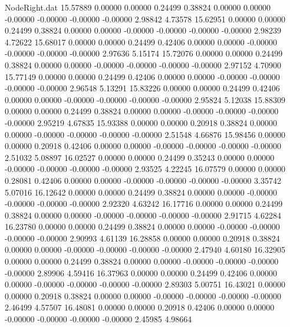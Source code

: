 \begin{filecontents}{NodeRight.dat}
  15.57889    0.00000    0.00000     0.24499    0.38824    0.00000    0.00000   -0.00000   -0.00000   -0.00000   -0.00000    2.98842    4.73578
  15.62951    0.00000    0.00000     0.24499    0.38824    0.00000    0.00000   -0.00000   -0.00000   -0.00000   -0.00000    2.98239    4.72622
  15.68017    0.00000    0.00000     0.24499    0.42406    0.00000    0.00000   -0.00000   -0.00000   -0.00000   -0.00000    2.97636    5.15174
  15.72076    0.00000    0.00000     0.24499    0.38824    0.00000    0.00000   -0.00000   -0.00000   -0.00000   -0.00000    2.97152    4.70900
  15.77149    0.00000    0.00000     0.24499    0.42406    0.00000    0.00000   -0.00000   -0.00000   -0.00000   -0.00000    2.96548    5.13291
  15.83226    0.00000    0.00000     0.24499    0.42406    0.00000    0.00000   -0.00000   -0.00000   -0.00000   -0.00000    2.95824    5.12038
  15.88309    0.00000    0.00000     0.24499    0.38824    0.00000    0.00000   -0.00000   -0.00000   -0.00000   -0.00000    2.95219    4.67835
  15.93388    0.00000    0.00000     0.20918    0.38824    0.00000    0.00000   -0.00000   -0.00000   -0.00000   -0.00000    2.51548    4.66876
  15.98456    0.00000    0.00000     0.20918    0.42406    0.00000    0.00000   -0.00000   -0.00000   -0.00000   -0.00000    2.51032    5.08897
  16.02527    0.00000    0.00000     0.24499    0.35243    0.00000    0.00000   -0.00000   -0.00000   -0.00000   -0.00000    2.93525    4.22245
  16.07579    0.00000    0.00000     0.28081    0.42406    0.00000    0.00000   -0.00000   -0.00000   -0.00000   -0.00000    3.35742    5.07016
  16.12642    0.00000    0.00000     0.24499    0.38824    0.00000    0.00000   -0.00000   -0.00000   -0.00000   -0.00000    2.92320    4.63242
  16.17716    0.00000    0.00000     0.24499    0.38824    0.00000    0.00000   -0.00000   -0.00000   -0.00000   -0.00000    2.91715    4.62284
  16.23780    0.00000    0.00000     0.24499    0.38824    0.00000    0.00000   -0.00000   -0.00000   -0.00000   -0.00000    2.90993    4.61139
  16.28858    0.00000    0.00000     0.20918    0.38824    0.00000    0.00000   -0.00000   -0.00000   -0.00000   -0.00000    2.47940    4.60180
  16.32905    0.00000    0.00000     0.24499    0.38824    0.00000    0.00000   -0.00000   -0.00000   -0.00000   -0.00000    2.89906    4.59416
  16.37963    0.00000    0.00000     0.24499    0.42406    0.00000    0.00000   -0.00000   -0.00000   -0.00000   -0.00000    2.89303    5.00751
  16.43021    0.00000    0.00000     0.20918    0.38824    0.00000    0.00000   -0.00000   -0.00000   -0.00000   -0.00000    2.46499    4.57507
  16.48081    0.00000    0.00000     0.20918    0.42406    0.00000    0.00000   -0.00000   -0.00000   -0.00000   -0.00000    2.45985    4.98664

\end{filecontents}
